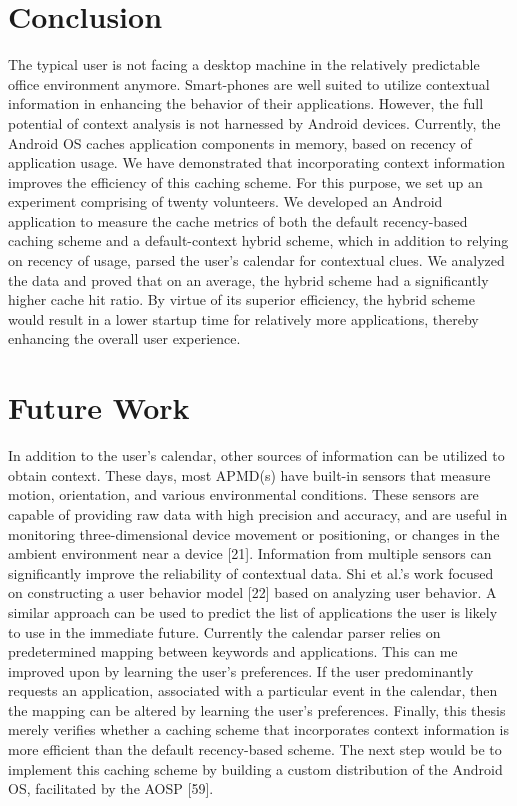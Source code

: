 \documentclass[12pt]{uthesis-v12}  %
\begin{document}
\chapter{Conclusion}
	The typical user is not facing a desktop machine in the relatively predictable office environment anymore. Smart-phones are well suited to utilize contextual information in enhancing the behavior of their applications. However, the full potential of context analysis is not harnessed by Android devices. Currently, the Android OS caches application components in memory, based on recency of application usage. We have demonstrated that incorporating context information improves the efficiency of this caching scheme. For this purpose, we set up an experiment comprising of twenty volunteers. We developed an Android application to measure the cache metrics of both the default recency-based caching scheme and a default-context hybrid scheme, which in addition to relying on recency of usage, parsed the user's calendar for contextual clues. We analyzed the data and proved that on an average, the hybrid scheme had a significantly higher cache hit ratio. By virtue of its superior efficiency, the hybrid scheme would result in a lower startup time for relatively more applications, thereby enhancing the overall user experience.
		
\chapter{Future Work}		
	In addition to the user's calendar, other sources of information can be utilized to obtain context. These days, most APMD(s) have built-in sensors that measure motion, orientation, and various environmental conditions. These sensors are capable of providing raw data with high precision and accuracy, and are useful in monitoring three-dimensional device movement or positioning, or changes in the ambient environment near a device [21]. Information from multiple sensors can significantly improve the reliability of contextual data. Shi et al.'s work focused on constructing a user behavior model [22] based on analyzing user behavior. A similar approach can be used to predict the list of applications the user is likely to use in the immediate future. Currently the calendar parser relies on predetermined mapping between keywords and applications. This can me improved upon by learning the user's preferences. If the user predominantly requests an application, associated with a particular event in the calendar, then the mapping can be altered by learning the user's preferences. Finally, this thesis merely verifies whether a caching scheme that incorporates context information is more efficient than the default recency-based scheme. The next step would be to implement this caching scheme by building a custom distribution of the Android OS, facilitated by the AOSP [59].
\end{document}
